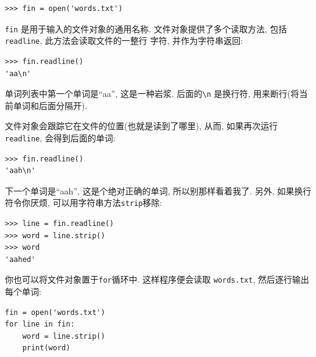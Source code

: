 \documentclass[10pt]{book}
\begin{document}
\begin{verbatim}
>>> fin = open('words.txt')
\end{verbatim}
%
{\tt fin} 是用于输入的文件对象的通用名称. 
文件对象提供了多个读取方法, 包括 {\tt readline}, 
此方法会读取文件的一整行
字符, 并作为字符串返回: 

\begin{verbatim}
>>> fin.readline()
'aa\n'
\end{verbatim}
%
单词列表中第一个单词是``aa'', 这是一种岩浆. 
后面的\verb"\n" 是换行符, 用来断行(将当前单词和后面分隔开). 

文件对象会跟踪它在文件的位置(也就是读到了哪里), 从而, 如果再次运行
{\tt readline}, 会得到后面的单词:

\begin{verbatim}
>>> fin.readline()
'aah\n'
\end{verbatim}
%
下一个单词是``aah'',  这是个绝对正确的单词, 所以别那样看着我了. 
另外, 如果换行符令你厌烦, 可以用字符串方法{\tt strip}移除:

\begin{verbatim}
>>> line = fin.readline()
>>> word = line.strip()
>>> word
'aahed'
\end{verbatim}
%
你也可以将文件对象置于{\tt for}循环中. 
这样程序便会读取 {\tt words.txt}, 然后逐行输出每个单词:

\begin{verbatim}
fin = open('words.txt')
for line in fin:
    word = line.strip()
    print(word)
\end{verbatim}
%
\end{document}
